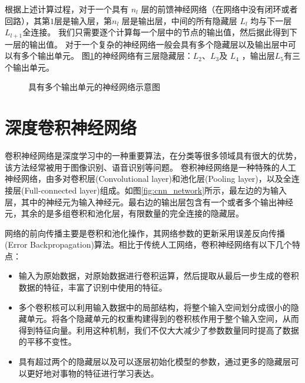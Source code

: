 





根据上述计算过程，对于一个具有 $n_l$ 层的前馈神经网络（在网络中没有闭环或者回路），其第$   1 $层是输入层，第$n_l$ 层是输出层，中间的所有隐藏层 $L_l$ 均与下一层 $L_{l+1}$全连接。
我们只需要逐个计算每一个层中的节点的输出值，然后据此得到下一层的输出值。
对于一个复杂的神经网络一般会具有多个隐藏层以及输出层中可以有多个输出单元。
图\ref{fig:network2}的神经网络有三层隐藏层：$  L_2 $、$ L_3$及 $ L_4$ ，输出层$  L_5 $有三个输出单元。

\begin{figure}
  \centering
  
  \caption{具有多个输出单元的神经网络示意图}
  \label{fig:network2}  
\end{figure}

\section{深度卷积神经网络}

卷积神经网络是深度学习中的一种重要算法，在分类等很多领域具有很大的优势，该方法经常被用于图像识别、语音识别等问题。
卷积神经网络是一种特殊的人工神经网络，由多对卷积层(Convolutional layer)和池化层(Pooling layer)，以及全连接层(Full-connected layer)组成。如图\ref{fig:cnn_network}所示，最左边的为输入层，其中的神经元为输入神经元。最右边的输出层包含有一个或者多个输出神经元，其余的是多组卷积和池化层，有限数量的完全连接的隐藏层。

网络的前向传播主要是卷积和池化操作，其网络参数的更新采用误差反向传播(Error Backpropagation)算法。相比于传统人工网络，卷积神经网络有以下几个特点：
\begin{itemize}
  \item 输入为原始数据，对原始数据进行卷积运算，然后提取从最后一步生成的卷积数据的特征，丰富了识别中使用的特征。
  \item 多个卷积核可以利用输入数据中的局部结构，将整个输入空间划分成很小的隐藏单元。将各个隐藏单元的权重构建得到的卷积核作用于整个输入空间，从而得到特征向量。利用这种机制，我们不仅大大减少了参数数量同时提高了数据的平移不变性。
  \item 具有超过两个的隐藏层以及可以逐层初始化模型的参数，通过更多的隐藏层可以更好地对事物的特征进行学习表达。
\end{itemize}

